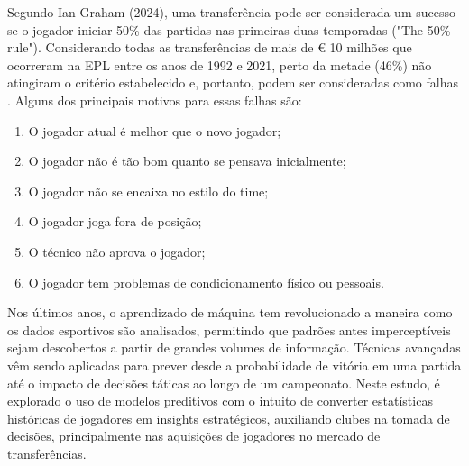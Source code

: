 Segundo Ian Graham (2024), uma transferência pode ser considerada um sucesso se o jogador iniciar 50\% das partidas nas primeiras duas temporadas ("The 50\% rule"). Considerando todas as transferências de mais de € 10 milhões que ocorreram na EPL entre os anos de 1992 e 2021, perto da metade (46\%) não atingiram o critério estabelecido e, portanto, podem ser consideradas como falhas \cite{Graham2024}. Alguns dos principais motivos para essas falhas são:

\begin{enumerate}
    \item O jogador atual é melhor que o novo jogador;
    \item O jogador não é tão bom quanto se pensava inicialmente;
    \item O jogador não se encaixa no estilo do time;
    \item O jogador joga fora de posição;
    \item O técnico não aprova o jogador;
    \item O jogador tem problemas de condicionamento físico ou pessoais.
\end{enumerate}

Nos últimos anos, o aprendizado de máquina tem revolucionado a maneira como os dados esportivos são analisados, permitindo que padrões antes imperceptíveis sejam descobertos a partir de grandes volumes de informação. Técnicas avançadas vêm sendo aplicadas para prever desde a probabilidade de vitória em uma partida até o impacto de decisões táticas ao longo de um campeonato. Neste estudo, é explorado o uso de modelos preditivos com o intuito de converter estatísticas históricas de jogadores em insights estratégicos, auxiliando clubes na tomada de decisões, principalmente nas aquisições de jogadores no mercado de transferências.
